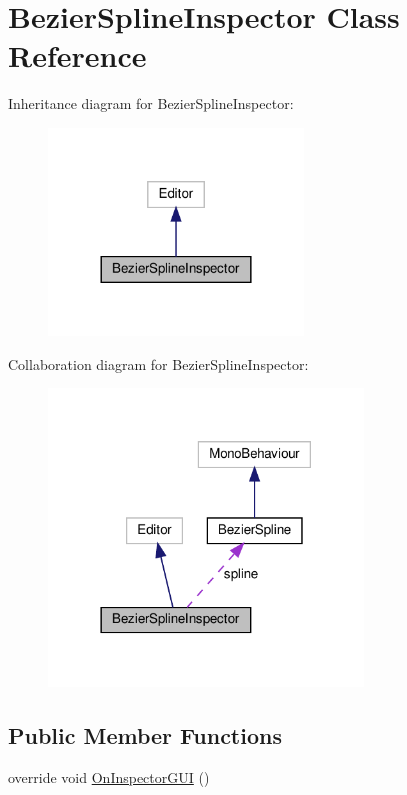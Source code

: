 \hypertarget{classBezierSplineInspector}{}\section{Bezier\+Spline\+Inspector Class Reference}
\label{classBezierSplineInspector}


Inheritance diagram for Bezier\+Spline\+Inspector\+:\nopagebreak
\begin{figure}[H]
\begin{center}
\leavevmode
\includegraphics[width=192pt]{classBezierSplineInspector__inherit__graph}
\end{center}
\end{figure}


Collaboration diagram for Bezier\+Spline\+Inspector\+:\nopagebreak
\begin{figure}[H]
\begin{center}
\leavevmode
\includegraphics[width=237pt]{classBezierSplineInspector__coll__graph}
\end{center}
\end{figure}
\subsection*{Public Member Functions}
\begin{DoxyCompactItemize}
\item 
override void \hyperlink{classBezierSplineInspector_a3232a5fd28ba98bf7b5d4aa170546f31}{On\+Inspector\+G\+UI} ()
\end{DoxyCompactItemize}
